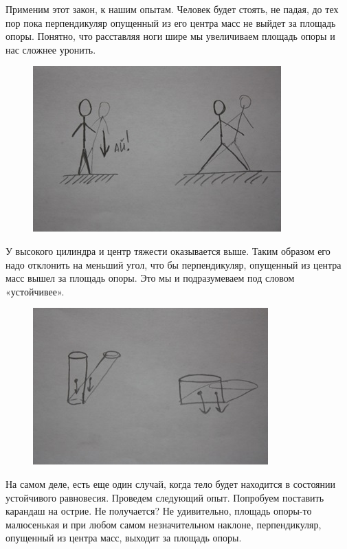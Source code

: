 Применим этот закон, к нашим опытам. Человек будет стоять, не падая, до тех пор пока перпендикуляр опущенный из его центра масс не выйдет за площадь опоры. Понятно, что расставляя ноги шире мы увеличиваем площадь опоры и нас сложнее уронить.
\begin{figure}[h!]
	\begin{center}
		\includegraphics[width=0.75\linewidth]{chapters/chapter8/images/6}
		\caption{}
		\label{ris:image8x6}
	\end{center}
\end{figure}

У высокого цилиндра и центр тяжести оказывается выше. Таким образом его надо отклонить на меньший угол, что бы перпендикуляр, опущенный из центра масс вышел за площадь опоры. Это мы и подразумеваем под словом «устойчивее».
\begin{figure}[h!]
	\begin{center}
		\includegraphics[width=0.75\linewidth]{chapters/chapter8/images/7}
		\caption{}
		\label{ris:image8x7}
	\end{center}
\end{figure}

На самом деле, есть еще один случай, когда тело будет находится в состоянии устойчивого равновесия. Проведем следующий опыт. Попробуем поставить карандаш на острие. Не получается? Не удивительно, площадь опоры-то малюсенькая и при любом самом незначительном наклоне, перпендикуляр, опущенный из центра масс, выходит за площадь опоры.

